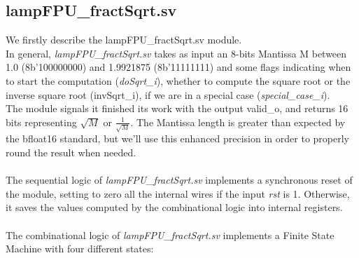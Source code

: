 \subsection{lampFPU\_fractSqrt.sv}
We firstly describe the lampFPU\_fractSqrt.sv module. \\
In general, \emph{lampFPU\_fractSqrt.sv} takes as input an 8-bits Mantissa M between 1.0 (8b'100000000) and 1.9921875 (8b'11111111) and some flags indicating when to start the computation (\emph{doSqrt\_i}), whether to compute the square root or the inverse square root ({invSqrt\_i}), if we are in a special case (\emph{special\_case\_i}).\\
The module signals it finished its work with the output valid\_o, and returns 16 bits representing $\sqrt{M}$ or $\frac{1}{\sqrt{M}}$. The Mantissa length is greater than expected by the bfloat16 standard, but we'll use this enhanced precision in order to properly round the result when needed.\\\\
The sequential logic of \emph{lampFPU\_fractSqrt.sv} implements a synchronous reset of the module, setting to zero all the internal wires if the input \emph{rst} is 1. Otherwise, it saves the values computed by the combinational logic into internal registers.\\\\
The combinational logic of \emph{lampFPU\_fractSqrt.sv} implements a Finite State Machine with four different states:
